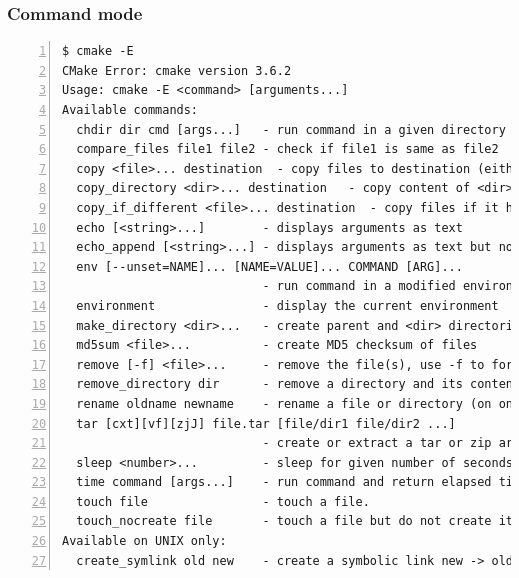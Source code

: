 \documentclass[compress,slidestop,table,usepdftitle=false
              ]
               {beamer}
\begin{document}
\begin{frame}[fragile]
\frametitle{Command mode}
\begin{Verbatim}[commandchars=\\\{\},fontsize=\tiny,numbers=left,frame=topline,label=list of command mode commands]
  $ cmake -E
CMake Error: cmake version 3.6.2
Usage: cmake -E <command> [arguments...]
Available commands: 
  chdir dir cmd [args...]   - run command in a given directory
  compare_files file1 file2 - check if file1 is same as file2
  copy <file>... destination  - copy files to destination (either file or directory)
  copy_directory <dir>... destination   - copy content of <dir>... directories to 'destination' directory
  copy_if_different <file>... destination  - copy files if it has changed
  echo [<string>...]        - displays arguments as text
  echo_append [<string>...] - displays arguments as text but no new line
  env [--unset=NAME]... [NAME=VALUE]... COMMAND [ARG]...
                            - run command in a modified environment
  environment               - display the current environment
  make_directory <dir>...   - create parent and <dir> directories
  md5sum <file>...          - create MD5 checksum of files
  remove [-f] <file>...     - remove the file(s), use -f to force it
  remove_directory dir      - remove a directory and its contents
  rename oldname newname    - rename a file or directory (on one volume)
  tar [cxt][vf][zjJ] file.tar [file/dir1 file/dir2 ...]
                            - create or extract a tar or zip archive
  sleep <number>...         - sleep for given number of seconds
  time command [args...]    - run command and return elapsed time
  touch file                - touch a file.
  touch_nocreate file       - touch a file but do not create it.
Available on UNIX only:
  create_symlink old new    - create a symbolic link new -> old
\end{Verbatim}
\end{frame}
\end{document}
